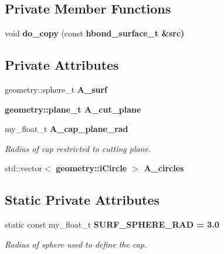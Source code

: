 \subsection*{Private Member Functions}
\begin{CompactItemize}
\item 
void \textbf{do\_\-copy} (const \bf{hbond\_\-surface\_\-t} \&src)\label{classSimSite3D_1_1hbond__surface__t_e9299a1f7a8dbf67c3136863dd2df237}

\end{CompactItemize}
\subsection*{Private Attributes}
\begin{CompactItemize}
\item 
geometry::sphere\_\-t \textbf{A\_\-surf}\label{classSimSite3D_1_1hbond__surface__t_95bfd3372bb83fadd0b1708da01dec8d}

\item 
\bf{geometry::plane\_\-t} \textbf{A\_\-cut\_\-plane}\label{classSimSite3D_1_1hbond__surface__t_397632033debf716dbcc7fc8ef81fb61}

\item 
my\_\-float\_\-t \bf{A\_\-cap\_\-plane\_\-rad}\label{classSimSite3D_1_1hbond__surface__t_83046f180c928461d3f67c4b3b81554c}

\begin{CompactList}\small\item\em Radius of cap restricted to cutting plane. \item\end{CompactList}\item 
std::vector$<$ \bf{geometry::i\-Circle} $>$ \textbf{A\_\-circles}\label{classSimSite3D_1_1hbond__surface__t_f0161567ebb1e37b69510969d76ddb86}

\end{CompactItemize}
\subsection*{Static Private Attributes}
\begin{CompactItemize}
\item 
static const my\_\-float\_\-t \bf{SURF\_\-SPHERE\_\-RAD} = 3.0\label{classSimSite3D_1_1hbond__surface__t_5779dc1ca7f6d66ef343d01ba14978b8}

\begin{CompactList}\small\item\em Radius of sphere used to define the cap. \item\end{CompactList}\end{CompactItemize}


